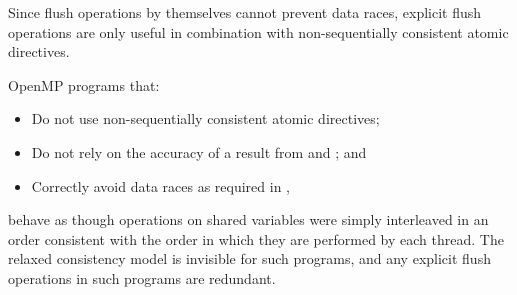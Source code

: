 \begin{note}
Since flush operations by themselves cannot prevent data races, explicit 
flush operations are only useful in combination with non-sequentially 
consistent atomic directives.
\end{note}

OpenMP programs that:

\begin{itemize}[rightmargin=11ex]
\item Do not use non-sequentially consistent atomic directives;
\item Do not rely on the accuracy of a  result from
       and ; and
\item Correctly avoid data races as required in 
      ,
\end{itemize}

behave as though operations on shared variables were simply interleaved 
in an order consistent with the order in which they are performed by 
each thread. The relaxed consistency model is invisible for such programs, 
and any explicit flush operations in such programs are redundant.
